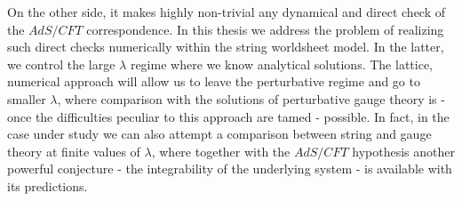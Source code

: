 On the other side, it makes highly non-trivial any dynamical and direct check of the $AdS/CFT$ correspondence. In this thesis we address the problem of realizing such direct checks numerically within the string worldsheet model. In the latter, we control the large $\lambda$ regime where we know analytical solutions. The lattice, numerical approach will allow us to leave the perturbative regime and go to smaller $\lambda$, where 
comparison with the solutions of  perturbative gauge theory is - once the difficulties peculiar to this approach are tamed - possible. 
In fact, in the case under study we can also attempt a comparison between string and gauge theory at finite values of $\lambda$, where together with the $AdS/CFT$ hypothesis another powerful conjecture - the integrability of the underlying system -  is available with its predictions.
%
%
%
%
%
%
%
%
